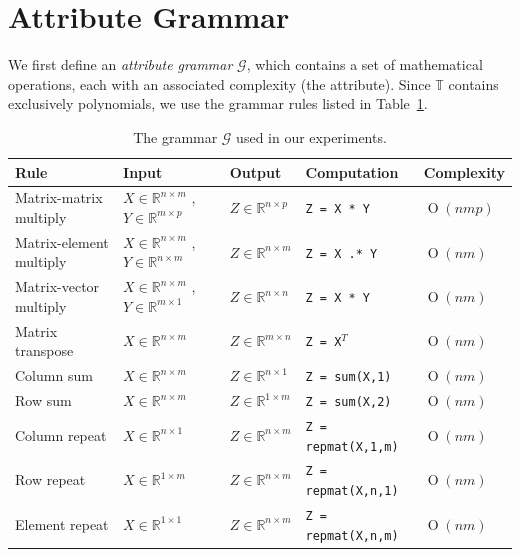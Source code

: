 \documentclass{article} %
\newcommand{\tab}[1]{Table~\ref{tab:#1}}
\newcommand{\BigO}[1]{\ensuremath{\operatorname{O}\left(#1\right)}}
\begin{document}
\section{Attribute Grammar}
We first define an {\em attribute grammar} $\mathcal{G}$, which contains
a set of mathematical operations, each with an associated
complexity (the attribute). Since $\mathbb{T}$ contains exclusively polynomials, we
use the grammar rules listed in \tab{grammar}.  
\begin{table}
\scriptsize
\centering
\begin{tabular}{|l|l|l|l|l|}
\hline
Rule & Input & Output & Computation & Complexity\\ \hline \hline
Matrix-matrix multiply & $X \in \mathbb{R}^{n \times m}$ , $Y \in \mathbb{R}^{m \times p}$ &
$Z \in \mathbb{R}^{n \times p}$ & \texttt{Z = X * Y}  & $\BigO{nmp}$  \\ \hline
Matrix-element multiply & $X \in \mathbb{R}^{n \times m}$ , $Y \in \mathbb{R}^{n \times m}$ &
$Z \in \mathbb{R}^{n \times m}$ & \texttt{Z = X .* Y}  & $\BigO{nm}$  \\ \hline
Matrix-vector multiply & $X \in \mathbb{R}^{n \times m}$ , $Y \in \mathbb{R}^{m \times 1}$ &
$Z \in \mathbb{R}^{n \times n}$ & \texttt{Z = X * Y}  & $\BigO{nm}$  \\ \hline
Matrix transpose & $X \in \mathbb{R}^{n \times m}$ &
$Z \in \mathbb{R}^{m \times n}$ & \texttt{Z = X$^T$}  & $\BigO{nm}$  \\ \hline
Column sum  &  $X \in \mathbb{R}^{n \times m}$ &
$Z \in \mathbb{R}^{n \times 1}$ & \texttt{Z = sum(X,1)}  & $\BigO{nm}$  \\ \hline
Row sum  & $X \in \mathbb{R}^{n \times m}$ &
$Z \in \mathbb{R}^{1 \times m}$ & \texttt{Z = sum(X,2)}  & $\BigO{nm}$  \\ \hline
Column repeat  & $X \in \mathbb{R}^{n \times 1}$ &
$Z \in \mathbb{R}^{n \times m}$ & \texttt{Z = repmat(X,1,m)}  & $\BigO{nm}$  \\ \hline
Row repeat &  $X \in \mathbb{R}^{1 \times m}$ &
$Z \in \mathbb{R}^{n \times m}$ & \texttt{Z = repmat(X,n,1)}  & $\BigO{nm}$  \\ \hline
Element repeat &  $X \in \mathbb{R}^{1 \times 1}$ &
$Z \in \mathbb{R}^{n \times m}$ & \texttt{Z = repmat(X,n,m)}  & $\BigO{nm}$  \\ \hline
\end{tabular}
\vspace{-1.5mm}
\caption{The grammar $\mathcal{G}$ used in our experiments.}
\label{tab:grammar}
\vspace{-4mm}
\end{table}
\end{document}
